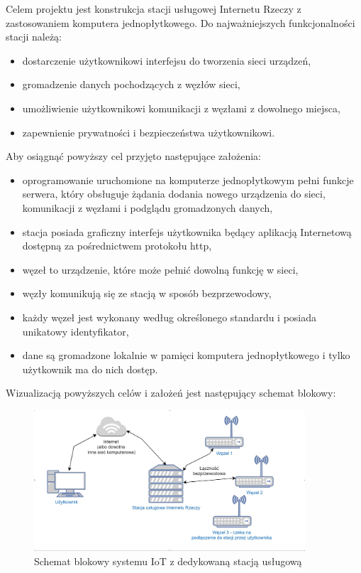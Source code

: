 \documentclass[12pt, twoside, openany]{mwrep}
\begin{document}
Celem projektu jest konstrukcja stacji usługowej Internetu Rzeczy z zastosowaniem komputera jednopłytkowego. Do najważniejszych funkcjonalności stacji należą:
\begin{itemize}
\item	dostarczenie użytkownikowi interfejsu do tworzenia sieci urządzeń,
\item	gromadzenie danych pochodzących z węzłów sieci,
\item	umożliwienie użytkownikowi komunikacji z węzłami z dowolnego miejsca,
\item	zapewnienie prywatności i bezpieczeństwa użytkownikowi.
\end{itemize}
Aby osiągnąć powyższy cel przyjęto następujące założenia:
\begin{itemize}
\item	oprogramowanie uruchomione na komputerze jednopłytkowym pełni funkcje serwera, który obsługuje żądania dodania nowego urządzenia do sieci, komunikacji z węzłami i podglądu gromadzonych danych,
\item	stacja posiada graficzny interfejs użytkownika będący aplikacją Internetową dostępną za pośrednictwem protokołu http,
\item	węzeł to urządzenie, które może pełnić dowolną funkcję w sieci,
\item	węzły komunikują się ze stacją w sposób bezprzewodowy,
\item każdy węzeł jest wykonany według określonego standardu i posiada unikatowy identyfikator,
\item	dane są gromadzone lokalnie w pamięci komputera jednopłytkowego i tylko użytkownik ma do nich dostęp. 
\end{itemize}
Wizualizacją powyższych celów i założeń jest następujący schemat blokowy:
\begin{figure}[H]
\centering
\includegraphics[width=0.9\textwidth]{zalozenia}
\caption{Schemat blokowy systemu IoT z dedykowaną stacją usługową}
\end{figure}
\end{document}
